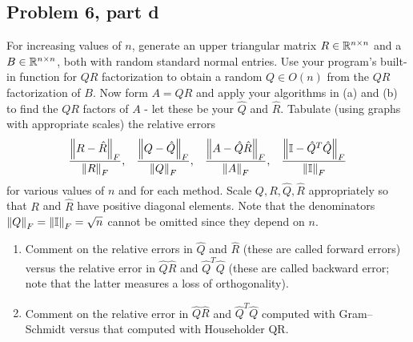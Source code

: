\newpage
\subsection{Problem 6, part d}
For increasing values of $n$, generate an upper triangular matrix $R\in \mathbb{R}^{n\times n}$ and a $B \in \mathbb{R}^{n\times n}$, both with random standard normal entries. Use your program's built-in function for $QR$ factorization to obtain a random $Q\in O(n)$ from the $QR$ factorization of $B$. Now form $A = QR$ and apply your algorithms in (a) and (b) to find the $QR$ factors of $A$ - let these be your $\hat{Q}$ and $\hat{R}$. Tabulate (using graphs with appropriate scales) the relative errors
\[
\frac{\norm{R - \hat{R}}_F}{\norm{R}_F}, \hspace{3mm} \frac{\norm{Q - \hat{Q}}_F}{\norm{Q}_F}, \hspace{3mm} \frac{\norm{A - \hat{Q}\hat{R}}_F}{\norm{A}_F}, \hspace{3mm} \frac{\norm{\mathbb{I} - \hat{Q}^T\hat{Q}}_F}{\norm{\mathbb{I}}_F} 
\]
for various values of $n$ and for each method. Scale $Q, R, \hat{Q}, \hat{R}$ appropriately so that $R$ and $\hat{R}$ have positive diagonal elements. Note that the denominators $\norm{Q}_F = \norm{\mathbb{I}}_F = \sqrt{n}$ cannot be omitted since they depend on $n$.
\begin{enumerate}
    \item Comment on the relative errors in $\hat{Q}$ and $\hat{R}$ (these are called forward errors) versus the relative error in $\hat{Q}\hat{R}$ and $\hat{Q}^T\hat{Q}$ (these are called backward error; note that the latter measures a loss of orthogonality).

    \item Comment on the relative error in $\hat{Q}\hat{R}$ and $\hat{Q}^T\hat{Q}$ computed with Gram–Schmidt versus that computed with Householder QR.
\end{enumerate}


